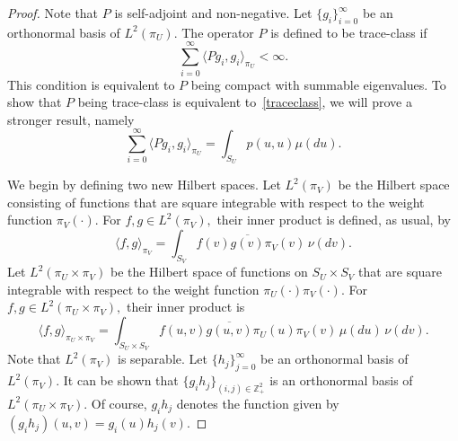 \documentclass[11pt]{article}
\begin{document}
	\begin{proof}
          Note that $P$ is self-adjoint and non-negative.  Let
          $\{g_i\}_{i=0}^{\infty}$ be an orthonormal basis of
          $L^2(\pi_U)$.  The operator $P$ is defined to be trace-class
          if \citep[see e.g.][]{conway2000course}
		\begin{equation} \label{traceclassdef}
		\sum_{i=0}^{\infty} \langle P g_i, g_i \rangle_{\pi_U} < \infty.
		\end{equation}
		This condition is equivalent to $P$ being compact with
                summable eigenvalues.  To show that $P$ being
                trace-class is equivalent to~\eqref{traceclass}, we
                will prove a stronger result, namely
		\begin{equation} \label{trace} \sum_{i=0}^{\infty}
                  \langle P g_i, g_i \rangle_{\pi_U}= \int_{S_U}
                  p(u,u) \mu(du).
		\end{equation}
		
		We begin by defining two new Hilbert spaces.  Let
                $L^2(\pi_V)$ be the Hilbert space consisting of
                functions that are square integrable with respect to
                the weight function $\pi_V(\cdot).$ For $f, g \in
                L^2(\pi_V),$ their inner product is defined, as usual,
                by
		\[
		\langle f, g \rangle_{\pi_V} = \int_{S_V} f(v)
                \overline{g(v)} \pi_V(v) \, \nu(dv).
		\]
		Let $L^2(\pi_U\times\pi_V)$ be the Hilbert space of
                functions on $S_U\times S_V$ that are square
                integrable with respect to the weight function
                $\pi_U(\cdot)\pi_V(\cdot).$ For $f, g \in
                L^2(\pi_U\times \pi_V),$ their inner product is
		\[
		\langle f, g\rangle_{\pi_U\times\pi_V} =
                \int_{S_U\times S_V} f(u,v) \overline{g(u,v)}
                \pi_U(u)\pi_V(v) \,\mu(du)\,\nu(dv).
		\]
		Note that $L^2(\pi_V)$ is separable. Let
                $\{h_j\}_{j=0}^{\infty}$ be an orthonormal basis of
                $L^2(\pi_V).$ It can be shown that $\{g_ih_j\}_{(i,j)
                  \in \mathbb{Z}_+^2}$ is an orthonormal basis of
                $L^2(\pi_U\times\pi_V)$.  Of course, $g_ih_j$ denotes
                the function given by $(g_ih_j)(u,v) = g_i(u)h_j(v).$
		

\end{proof}
\end{document}
